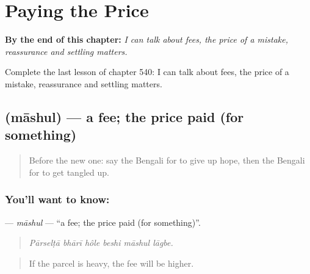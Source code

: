 
\chapter{Paying the Price}
\label{ch:bn-paying-the-price}

\begin{chapteropening}
\textbf{By the end of this chapter:} \emph{I can talk about fees, the price of a mistake, reassurance and settling matters.}

Complete the last lesson of chapter 540: I can talk about fees, the price of a mistake, reassurance and settling matters.
\end{chapteropening}

\section[\texorpdfstring{\bn{মাশুল} (māshul)}{মাশুল (māshul)}]{ (māshul) — a fee; the price paid (for something)}

\label{lesson:BN-C540-mashul}



\begin{quote}
Before the new one: say the Bengali for to give up hope, then the Bengali for to get tangled up.
\end{quote}

\subsection*{You'll want to know: }
\textbf{} — \emph{māshul} — \textquotedblleft{}a fee; the price paid (for something)\textquotedblright{}.

\begin{quote}
     
\end{quote}

\begin{quote}
\emph{Pārselṭā bhārī hôle beshi māshul lāgbe.}
\end{quote}

\begin{quote}
If the parcel is heavy, the fee will be higher.
\end{quote}

